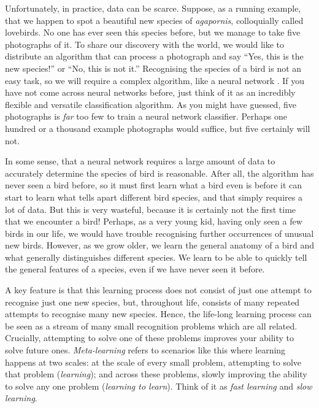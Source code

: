 \documentclass[12pt, twoside]{report}
\begin{document}
Unfortunately, in practice, data can be scarce. 
Suppose, as a running example, that we happen to spot a beautiful new species of \emph{agapornis}, colloquially called lovebirds.
No one has ever seen this species before, but we manage to take five photographs of it.
To share our discovery with the world, we would like to distribute an algorithm that can process a photograph and say ``Yes, this is the new species!'' or ``No, this is not it.''
Recognising the species of a bird is not an easy task, so we will require a complex algorithm, like a neural network \parencite{McCulloch:1943:A_Logical_Calculus_of_Ideas,Rosenblatt:1958:The_Perceptron_A_Probabilistic_Model,Ivakhnenko:1965:Cybernetic_Predicting_Devices,Fukushima:1982:Neocognitron_A_Self-Organizing_Neural_Network,Werbos:1982:Applications_of_Advances_in_Nonlinear,LeCun:1989:Backpropagation_Applied_to_Handwritten_Zip}.
If you have not come across neural networks before, just think of it as an incredibly flexible and versatile classification algorithm.
As you might have guessed, five photographs is \emph{far} too few to train a neural network classifier.
Perhaps one hundred or a thousand example photographs would suffice, but five certainly will not.

In some sense, that a neural network requires a large amount of data to accurately determine the species of bird is reasonable.
After all, the algorithm has never seen a bird before,
so it must first learn what a bird even is before it can start to learn what tells apart different bird species,
and that simply requires a lot of data.
But this is very wasteful, because it is certainly not the first time that we encounter a bird!
Perhaps, as a very young kid, having only seen a few birds in our life, we would have trouble recognising further occurrences of unusual new birds.
However, as we grow older, we learn the general anatomy of a bird and what generally distinguishes different species.
We learn to be able to quickly tell the general features of a species, even if we have never seen it before.

A key feature is that this learning process does not consist of just one attempt to recognise just one new species, but, throughout life, consists of many repeated attempts to recognise many new species.
Hence, the life-long learning process can be seen as a stream of many small recognition problems which are all related. %
Crucially, attempting to solve one of these problems improves your ability to solve future ones.
\emph{Meta-learning} refers to scenarios like this where learning happens at two scales:
at the scale of every small problem, attempting to solve that problem (\emph{learning});
and across these problems, slowly improving the ability to solve any one problem (\emph{learning to learn}).
Think of it as \emph{fast learning} and \emph{slow learning}. 
\end{document}
